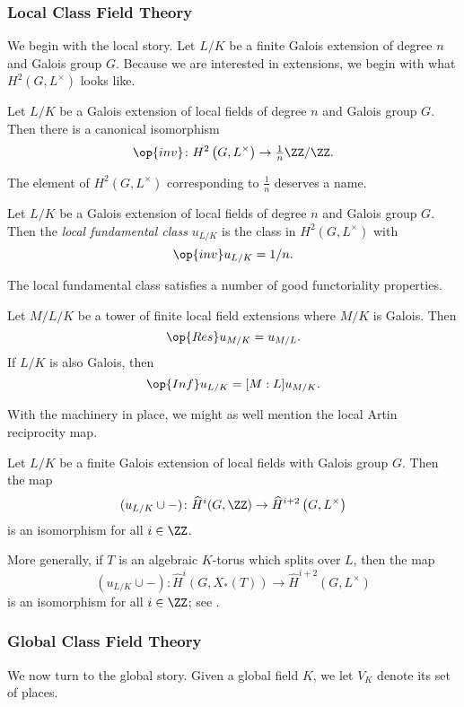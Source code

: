 \subsubsection{Local Class Field Theory}
We begin with the local story. Let $L/K$ be a finite Galois extension of  degree $n$ and Galois group $G$. Because we are interested in extensions, we begin with what $H^2\left(G,L^\times\right)$ looks like.
\begin{theorem}
	Let $L/K$ be a Galois extension of local fields of degree $n$ and Galois group $G$. Then there is a canonical isomorphism
	\[\op{inv}\colon H^2\left(G,L^\times\right)\to{\textstyle\frac1n}\ZZ/\ZZ.\]
\end{theorem}
The element of $H^2(G,L^\times)$ corresponding to $\frac1n$ deserves a name.
\begin{definition}
	Let $L/K$ be a Galois extension of local fields of degree $n$ and Galois group $G$. Then the \textit{local fundamental class} $u_{L/K}$ is the class in $H^2\left(G,L^\times\right)$ with
	\[\op{inv}u_{L/K}=1/n.\]
\end{definition}
The local fundamental class satisfies a number of good functoriality properties.
\begin{proposition} \label{prop:functorialfundclass}
	Let $M/L/K$ be a tower of finite local field extensions where $M/K$ is Galois. Then
	\[\op{Res}u_{M/K}=u_{M/L}.\]
	If $L/K$ is also Galois, then
	\[\op{Inf}u_{L/K}=[M:L]u_{M/K}.\]
\end{proposition}
With the machinery in place, we might as well mention the local Artin reciprocity map.
\begin{theorem}
	Let $L/K$ be a finite Galois extension of local fields with Galois group $G$. Then the map
	\[(u_{L/K}\cup-)\colon\widehat H^i(G,\ZZ)\to\widehat H^{i+2}\left(G,L^\times\right)\]
	is an isomorphism for all $i\in\ZZ$.
\end{theorem}
\begin{remark}
	More generally, if $T$ is an algebraic $K$-torus which splits over $L$, then the map
	\[(u_{L/K}\cup-)\colon\widehat H^i(G,X_*(T))\to\widehat H^{i+2}\left(G,L^\times\right)\]
	is an isomorphism for all $i\in\ZZ$; see \cite[Theorem~6.2]{alg-tori}.
\end{remark}

\subsubsection{Global Class Field Theory}
We now turn to the global story. Given a global field $K$, we let $V_K$ denote its set of places.

